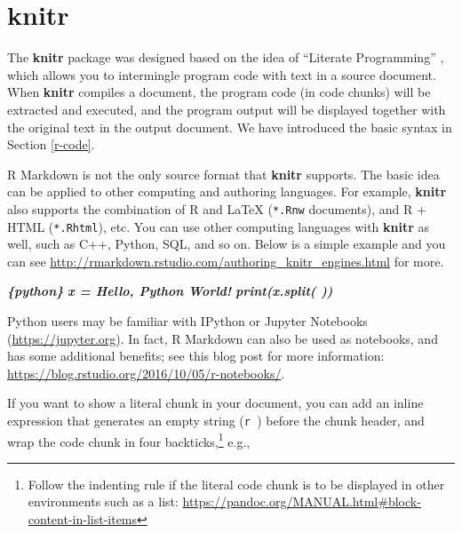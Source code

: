 \documentclass[
  12pt,
]{krantz}
\newenvironment{Shaded}{\begin{snugshade}}{\end{snugshade}}
\newcommand{\InformationTok}[1]{\textcolor[rgb]{0.56,0.35,0.01}{\textbf{\textit{#1}}}}
\theoremstyle{definition}
\theoremstyle{definition}
\theoremstyle{definition}
\theoremstyle{definition}
\theoremstyle{remark}
\begin{document}
\section{knitr}\label{knitr}

The \textbf{knitr} package was designed based on the idea of ``Literate Programming'' \citep{knuth1984}, which allows you to intermingle program code with text in a source document. When \textbf{knitr} compiles a document, the program code (in code chunks) will be extracted and executed, and the program output will be displayed together with the original text in the output document. We have introduced the basic syntax in Section \ref{r-code}.

R Markdown is not the only source format that \textbf{knitr} supports. The basic idea can be applied to other computing and authoring languages. For example, \textbf{knitr} also supports the combination of R and LaTeX (\texttt{*.Rnw} documents), and R + HTML (\texttt{*.Rhtml}), etc. You can use other computing languages with \textbf{knitr} as well, such as C++, Python, SQL, and so on. Below is a simple example and you can see \url{http://rmarkdown.rstudio.com/authoring_knitr_engines.html} for more.

\begin{Shaded}
\begin{Highlighting}[]
\InformationTok{\textasciigrave{}\textasciigrave{}\textasciigrave{}\{python\}}
\InformationTok{x = \textquotesingle{}Hello, Python World!\textquotesingle{}}
\InformationTok{print(x.split(\textquotesingle{} \textquotesingle{}))}
\InformationTok{\textasciigrave{}\textasciigrave{}\textasciigrave{}}
\end{Highlighting}
\end{Shaded}

Python users may be familiar with IPython or Jupyter Notebooks (\url{https://jupyter.org}). In fact, R Markdown can also be used as notebooks, and has some additional benefits; see this blog post for more information: \url{https://blog.rstudio.org/2016/10/05/r-notebooks/}.

If you want to show a literal chunk in your document, you can add an inline expression that generates an empty string (\texttt{\textasciigrave{}r\ \textquotesingle{}\textquotesingle{}\textasciigrave{}}) before the chunk header, and wrap the code chunk in four backticks,\footnote{Follow the indenting rule if the literal code chunk is to be displayed in other environments such as a list: \url{https://pandoc.org/MANUAL.html\#block-content-in-list-items}} e.g.,
\end{document}
